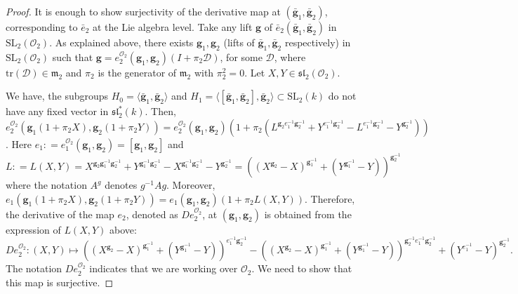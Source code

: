 \documentclass[10pt,twoside]{amsart}
\newcommand{\SL}{\mathrm{SL}}
\newcommand{\tr}{\mathrm{tr}}
\newcommand{\R}{\mathcal{O}_2}
\theoremstyle{definition}
\theoremstyle{definition}
\begin{document}
\begin{proof}
It is enough to show surjectivity of the derivative map at $(\mathbf{\bar g}_1, \mathbf{\bar g}_2)$, corresponding to $\bar e_{2}$ at the Lie algebra level. Take any lift $\mathbf{g}$ of $\bar e_{2}(\mathbf{\bar g}_1, \mathbf{\bar g}_2)$ in $\SL_2(\mathcal{O}_2)$. As explained above, there exists $\mathbf{g}_1, \mathbf{g}_2$ (lifts of $\mathbf{\bar g}_1, \mathbf{\bar g}_2$ respectively) in $\SL_2(\mathcal{O}_2)$ such that $\mathbf{g} = e_{2}^{\R}(\mathbf{g}_1, \mathbf{g}_2)(I+ \pi_2 \mathcal{D})$, for some $\mathcal D$, where $\tr(\mathcal{D})\in \mathfrak{m}_2$ and $\pi_2$ is the generator of $\mathfrak{m}_2$ with $\pi_2^2=0$. Let $X, Y\in \mathfrak{sl}_2(\mathcal{O}_2)$. 
    
We have, the subgroups $H_0= \langle \mathbf{\bar g}_1, \mathbf{\bar g}_2\rangle$ and $H_1 = \langle [\mathbf{\bar g}_1, \mathbf{\bar g}_2], \mathbf{\bar g}_2\rangle\subset \SL_2(k)$ do not have any fixed vector in $\mathfrak {sl}_2^*(k)$. Then, $e_2^{\R}(\mathbf{g}_1(1+ \pi_2 X), \mathbf{g}_2(1+ \pi_2 Y)) = e_2^{\R}(\mathbf{g}_1, \mathbf{g}_2)\left(1 + \pi_2 (L^{\mathbf{g}_2 e_1^{-1} \mathbf{g}_2^{-1}} + Y^{e_1^{-1} \mathbf{g}_2^{-1}} -L^{e_1^{-1} \mathbf{g}_2^{-1}} - Y^{\mathbf{g}_2^{-1}})\right)$. Here $e_1: = e_1^{\R}(\mathbf{g}_1, \mathbf{g}_2) = [\mathbf{g}_1, \mathbf{g}_2]$ and $L: = L(X, Y) = X^{\mathbf{g}_2 \mathbf{g}_1^{-1} \mathbf{g}_2^{-1}} + Y^{\mathbf{g}_1^{-1} \mathbf{g}_2^{-1}} -X^{\mathbf{g}_1^{-1} \mathbf{g}_2^{-1}}-Y^{\mathbf{g}_2^{-1}} = \left((X^{\mathbf{g}_2}-X)^{\mathbf{g}_1^{-1}} + (Y^{\mathbf{g}_1^{-1}}-Y)\right)^{\mathbf{g}_2^{-1}}$ where the notation $A^g$ denotes $g^{-1}Ag$. Moreover, $e_1(\mathbf{g}_1(1 + \pi_2 X), \mathbf{g}_2(1 + \pi_2 Y)) = e_1(\mathbf{g}_1, \mathbf{g}_2)\left(1 + \pi_2 L(X,Y)\right)$. Therefore, the derivative of the map $e_2$, denoted as $De^{\R}_2$, at $(\mathbf{g}_1, \mathbf{g}_2)$ is obtained from the expression of $L(X, Y)$ above:
$$De^{\R}_2\colon (X, Y) \mapsto \left((X^{\mathbf{g}_2}-X)^{\mathbf{g}_1^{-1}} + (Y^{\mathbf{g}_1^{-1}}-Y)\right)^{e_1^{-1}\mathbf{g}_2^{-1}} - \left((X^{\mathbf{g}_2}-X)^{\mathbf{g}_1^{-1}}+(Y^{\mathbf{g}_1^{-1}} -Y)\right)^{\mathbf{g}_2^{-1}e_1^{-1}\mathbf{g}_2^{-1}}+(Y^{e_1^{-1}}-Y)^{\mathbf{g}_2^{-1}}.$$ 
The notation $De^{\R}_2$ indicates that we are working over $\mathcal{O}_2$. We need to show that this map is surjective. 


\end{proof}
\end{document}
